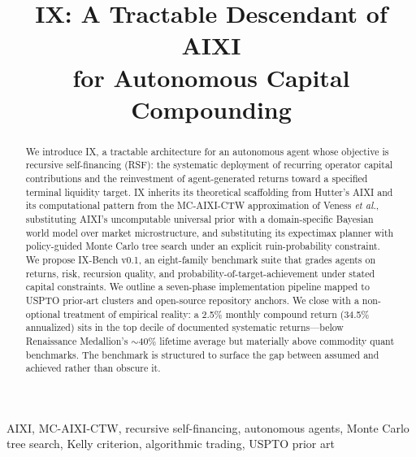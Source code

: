 \documentclass[conference,10pt,letterpaper]{IEEEtran}
\begin{document}
\title{IX: A Tractable Descendant of AIXI \\ for Autonomous Capital Compounding}

\author{
}

\maketitle

\begin{abstract}
We introduce IX, a tractable architecture for an autonomous agent whose
objective is recursive self-financing (RSF): the systematic
deployment of recurring operator capital contributions and the
reinvestment of agent-generated returns toward a specified terminal
liquidity target. IX inherits its theoretical scaffolding
from Hutter's AIXI and its computational pattern from the MC-AIXI-CTW
approximation of Veness \textit{et al.}, substituting AIXI's uncomputable
universal prior with a domain-specific Bayesian world model over market
microstructure, and substituting its expectimax planner with policy-guided
Monte Carlo tree search under an explicit ruin-probability constraint. We
propose IX-Bench v0.1, an eight-family benchmark suite that grades agents on
returns, risk, recursion quality, and probability-of-target-achievement under
stated capital constraints. We outline a seven-phase implementation pipeline
mapped to USPTO prior-art clusters and open-source repository anchors. We
close with a non-optional treatment of empirical reality: a 2.5\%
monthly compound return (34.5\% annualized) sits in the top decile of
documented systematic returns---below Renaissance Medallion's
$\sim$40\% lifetime average but materially above commodity quant
benchmarks. The benchmark is structured to surface the gap between
assumed and achieved rather than obscure it.
\end{abstract}

\begin{IEEEkeywords}
AIXI, MC-AIXI-CTW, recursive self-financing, autonomous agents,
Monte Carlo tree search, Kelly criterion, algorithmic trading,
USPTO prior art
\end{IEEEkeywords}
\end{document}

